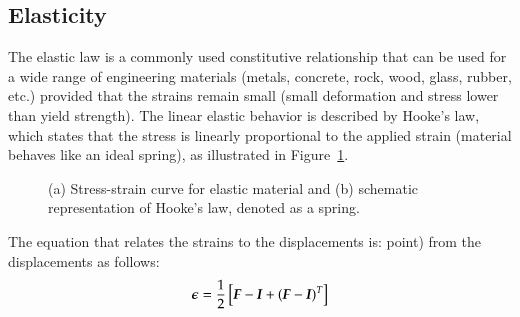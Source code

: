 \subsection{Elasticity}
The elastic law is a commonly used constitutive relationship that can
be used for a wide range of engineering materials (\eg metals,
concrete, rock, wood, glass, rubber, etc.) provided that the strains
remain small (\ie small deformation and stress lower than yield
strength). The linear elastic behavior is described by Hooke's law,
which states that the stress is linearly proportional to the applied
strain (material behaves like an ideal spring), as illustrated in
Figure~\ref{fig:smm:cl:elastic}.
\begin{figure}[!htb]
  \begin{center}

    \hspace{0.05\textwidth} 
    \caption{(a) Stress-strain curve for elastic material and (b)
      schematic representation of Hooke's law, denoted as a spring.}
    \label{fig:smm:cl:elastic}
  \end{center}
\end{figure}
The equation that relates the strains to the
displacements is: %
point) from the displacements as follows:
\begin{equation}
\label{eqn:smm:strain_inf}
\boldsymbol{\epsilon} =
\frac{1}{2} \left[ \boldsymbol{F}-\boldsymbol{I}+(\boldsymbol{F}-\boldsymbol{I})^T \right]
\end{equation}
